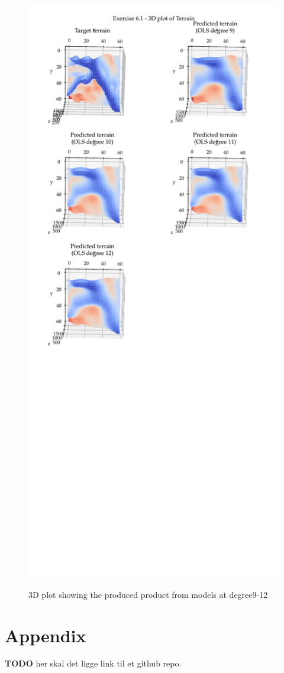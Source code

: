 \documentclass[11pt, a4paper]{article}
\begin{document}
\begin{figure}
  \centering
  \caption{3D plot showing the produced product from models at degree9-12}
  \hspace*{-1.2cm}  
  \includegraphics[scale=0.95]{figures/EX6_EX1_target_terrain_and_OLS_prediction_3D.pdf}
  \label{fig:EX6_1_OLS_3D}
\end{figure}


\section*{Appendix\label{sec:A}}
\textbf{TODO} her skal det ligge link til et github repo.

\newpage
\newpage



\end{document}
